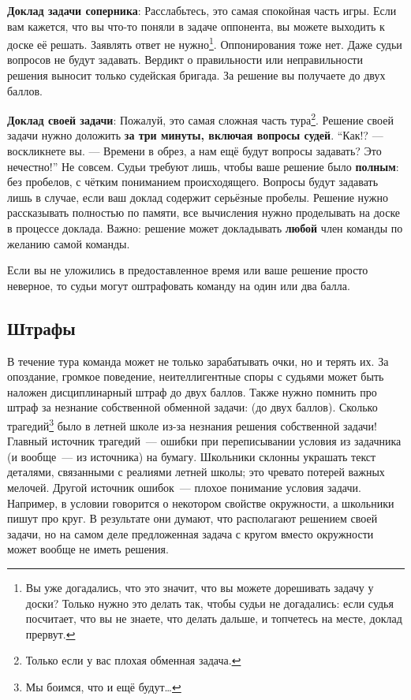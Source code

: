 \documentclass[12pt]{article}
\begin{document}
{\bf Доклад задачи соперника}: Расслабьтесь, это самая спокойная часть игры. Если вам кажется, что вы что-то поняли в задаче оппонента, вы можете выходить к доске её решать. Заявлять ответ не нужно\footnote{Вы уже догадались, что это значит, что вы можете дорешивать задачу у доски? Только нужно это делать так, чтобы судьи не догадались: если судья посчитает, что вы не знаете, что делать дальше, и топчетесь на месте, доклад прервут.}. Оппонирования тоже нет. Даже судьи вопросов не будут задавать. Вердикт о правильности или неправильности решения выносит только судейская бригада. За решение вы получаете до двух баллов.

{\bf Доклад своей задачи}: Пожалуй, это самая сложная часть тура\footnote{Только если у вас плохая обменная задача.}. Решение своей задачи нужно доложить {\bf за три минуты, включая вопросы судей}. ``Как!? --- воскликнете вы. --- Времени в обрез, а нам ещё будут вопросы задавать? Это нечестно!'' Не совсем. Судьи требуют лишь, чтобы ваше решение было {\bf полным}: без пробелов, с чётким пониманием происходящего. Вопросы будут задавать лишь в случае, если ваш доклад содержит серьёзные пробелы. Решение нужно рассказывать полностью по памяти, все вычисления нужно проделывать на доске в процессе доклада. Важно: решение может докладывать {\bf любой} член команды по желанию самой команды.

Если вы не уложились в предоставленное время или ваше решение просто неверное, то судьи могут оштрафовать команду на один или два балла.

\subsection*{Штрафы}
В течение тура команда может не только зарабатывать очки, но и терять их. За опоздание, громкое поведение, неителлигентные споры с судьями может быть наложен дисциплинарный штраф до двух баллов. Также нужно помнить про штраф за незнание собственной обменной задачи: (до двух баллов). Сколько трагедий\footnote{Мы боимся, что и ещё будут\ldots} было в летней школе из-за незнания решения собственной задачи! Главный источник трагедий~--- ошибки при переписывании условия из задачника (и вообще~--- из источника) на бумагу. Школьники склонны украшать текст деталями, связанными с реалиями летней школы; это чревато потерей важных мелочей. Другой источник ошибок~--- плохое понимание условия задачи. Например, в условии говорится о некотором свойстве окружности, а школьники пишут про круг. В результате они думают, что располагают решением своей задачи, но на самом деле предложенная задача с кругом вместо окружности может вообще не иметь решения.
\end{document}
